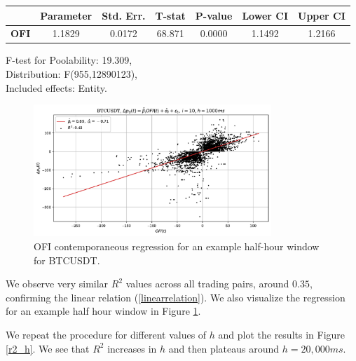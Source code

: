 \begin{table}[H]
\begin{center}
\begin{tabular}{lclc}
\hline
\end{tabular}
\begin{tabular}{lcccccc}
             & \textbf{Parameter} & \textbf{Std. Err.} & \textbf{T-stat} & \textbf{P-value} & \textbf{Lower CI} & \textbf{Upper CI}  \\
\hline
\textbf{OFI} &       1.1829       &       0.0172       &      68.871     &      0.0000      &       1.1492      &       1.2166       \\
\hline
\end{tabular}
\end{center}
F-test for Poolability: 19.309, \\
Distribution: F(955,12890123),\\
Included effects: Entity.
\end{table}

\begin{figure}[H]
    \centering
    \includegraphics[width=0.8\textwidth]{./images/btcusdt_h=1000ms_contemp_OFI.pdf}
    \caption{OFI contemporaneous regression for an example half-hour window for BTCUSDT.}
    \label{fig:contemp_OFI_btcusdt}
\end{figure}

We observe very similar $R^2$ values across all trading pairs, around $0.35$, confirming the
linear relation (\ref{linearrelation}). We also visualize the regression for an example half hour window in Figure \ref{fig:contemp_OFI_btcusdt}.

We repeat the procedure for different values of $h$ and plot the results in Figure \ref{r2_h}.
We see that $R^2$ increases in  $h$ and then plateaus around $h=20,000ms$.

